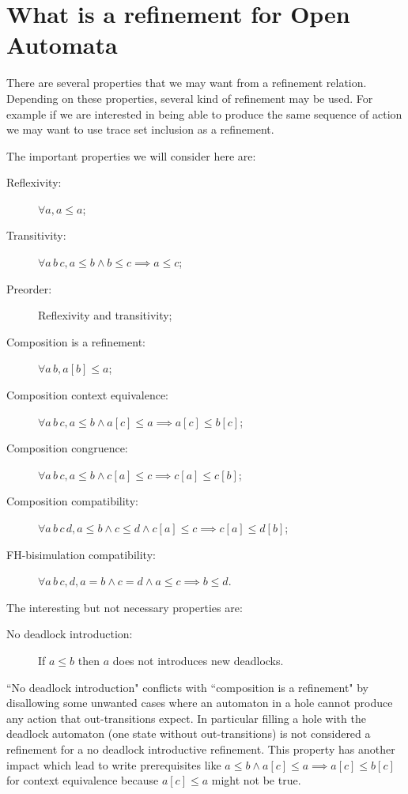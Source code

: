 \documentclass{article}
\theoremstyle{plain}
\theoremstyle{definition}
\newcommand\mbrk[1]{{\left[#1\right]}}
\begin{document}
\section{What is a refinement for Open Automata} %
There are several properties that we may want from a refinement relation.
Depending on these properties, several kind of refinement may be used.
For example if we are interested in being able to produce the same sequence of action we may want to use trace set inclusion as a refinement.

The important properties we will consider here are:
\begin{description}
\item[Reflexivity:] \(\forall a, a \leq a\);
\item[Transitivity:] \(\forall a\, b\, c, a \leq b \wedge b \leq c \implies a \leq c\);
\item[Preorder:] Reflexivity and transitivity;
\item[Composition is a refinement:] \(\forall a\, b, a\mbrk{b} \leq a\);
\item[Composition context equivalence:] \(\forall a\, b\, c, a \leq b \wedge a\mbrk{c} \leq a \implies a\mbrk{c} \leq b\mbrk{c}\);
\item[Composition congruence:] \(\forall a\, b\, c, a \leq b \wedge c\mbrk{a} \leq c \implies c\mbrk{a} \leq c\mbrk{b}\);
\item[Composition compatibility:] \(\forall a\, b\, c\, d, a \leq b \wedge c \leq d \wedge c\mbrk{a} \leq c \implies c\mbrk{a} \leq d\mbrk{b}\);
\item[FH-bisimulation compatibility:] \(\forall a\, b\, c, d, a = b \wedge c = d \wedge a \leq c \implies b \leq d\).
\end{description}
The interesting but not necessary properties are:
\begin{description}
\item[No deadlock introduction:] If \(a \leq b\) then \(a\) does not introduces new deadlocks.
\end{description}
``No deadlock introduction" conflicts with ``composition is a refinement" by disallowing some unwanted cases where an automaton in a hole cannot produce any action that out-transitions expect.
In particular filling a hole with the deadlock automaton (one state without out-transitions) is not considered a refinement for a no deadlock introductive refinement.
This property has another impact which lead to write prerequisites like \(a \leq b \wedge a\mbrk{c} \leq a \implies a\mbrk{c} \leq b\mbrk{c}\) for context equivalence because \(a\mbrk{c} \leq a\) might not be true.
\end{document}
